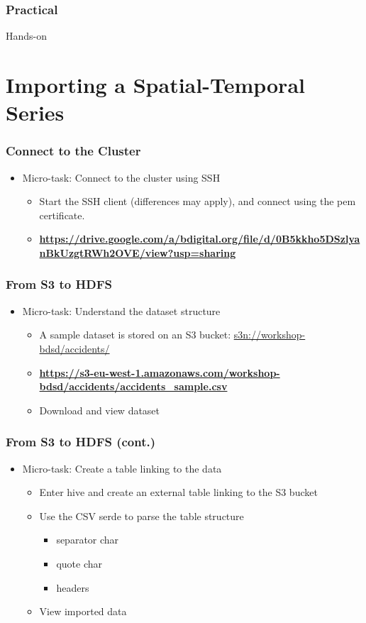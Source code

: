 \documentclass[hyperref={pdfpagelabels=true}]{beamer}
\begin{document}
\begin{frame}
\frametitle{Practical}
  \huge{Hands-on}
\end{frame}


\section{Importing a Spatial-Temporal Series} 

\begin{frame}
\frametitle{Connect to the Cluster}
\begin{itemize}
  \item<1->Micro-task: Connect to the cluster using SSH
  \begin{itemize}
    \item<2->Start the SSH client (differences may apply), and connect using the pem certificate.
    \item<2->\textbf{\url{https://drive.google.com/a/bdigital.org/file/d/0B5kkho5DSzlyanBkUzgtRWh2OVE/view?usp=sharing}}    
  \end{itemize}
\end{itemize}
\end{frame}

\begin{frame}
\frametitle{From S3 to HDFS}
\begin{itemize}
  \item<1->Micro-task: Understand the dataset structure
  \begin{itemize}
    \item<1->A sample dataset is stored on an S3 bucket: \url{s3n://workshop-bdsd/accidents/}
    \item<2->\textbf{\url{https://s3-eu-west-1.amazonaws.com/workshop-bdsd/accidents/accidents\_sample.csv}}
    \item<3->Download and view dataset
  \end{itemize}
\end{itemize}
\end{frame}

\begin{frame}
\frametitle{From S3 to HDFS (cont.)}
\begin{itemize}
  \item<1->Micro-task: Create a table linking to the data
  \begin{itemize}
    \item<1->Enter hive and create an external table linking to the S3 bucket
    \item<2->Use the CSV serde to parse the table structure
      \begin{itemize}
	\item<3->separator char
	\item<3->quote char
	\item<3->headers
       \end{itemize}
    \item<4->View imported data       
  \end{itemize}
\end{itemize}
\end{frame}
\end{document}
